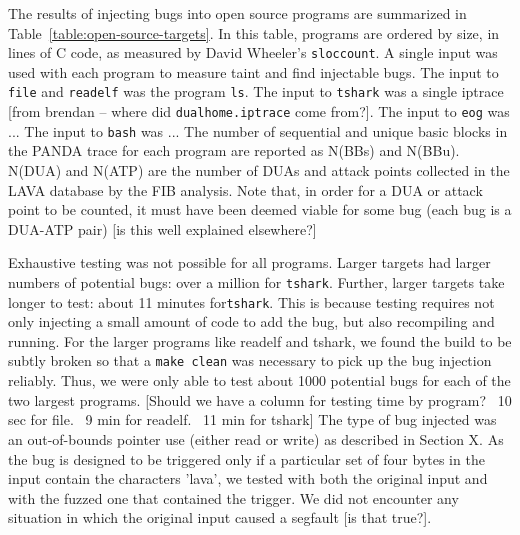 The results of injecting bugs into open source programs are summarized in Table~\ref{table:open-source-targets}.
In this table, programs are ordered by size, in lines of C code, as measured by David Wheeler's \verb+sloccount+.  %
A single input was used with each program to measure taint and find injectable bugs.
The input to \verb+file+ and \verb+readelf+ was the program \verb+ls+.
The input to \verb+tshark+ was a single iptrace [from brendan -- where did \verb+dualhome.iptrace+ come from?]. 
The input to \verb+eog+ was ...
The input to \verb+bash+ was ...
The number of sequential and unique basic blocks in the PANDA trace for each program are reported as N(BBs) and N(BBu).
N(DUA) and N(ATP) are the number of DUAs and attack points collected in the LAVA database by the FIB analysis.
Note that, in order for a DUA or attack point to be counted, it must have been deemed viable for some bug (each bug is a DUA-ATP pair) [is this well explained elsewhere?]

Exhaustive testing was not possible for all programs.  
Larger targets had larger numbers of potential bugs: over a million for \verb+tshark+.
Further, larger targets take longer to test: about 11 minutes for\verb+tshark+.
This is because testing requires not only injecting a small amount of code to add the bug, but also recompiling and running.
For the larger programs like readelf and tshark, we found the build to be subtly broken so that a \verb+make clean+ was necessary to pick up the bug injection reliably.
Thus, we were only able to test about 1000 potential bugs for each of the two largest programs. 
[Should we have a column for testing time by program?  ~10 sec for file.  ~9 min for readelf.  ~11 min for tshark]
The type of bug injected was an out-of-bounds pointer use (either read or write) as described in Section X.
As the bug is designed to be triggered only if a particular set of four bytes in the input contain the characters 'lava',
we tested with both the original input and with the fuzzed one that contained the trigger. 
We did not encounter any situation in which the original input caused a segfault [is that true?].

